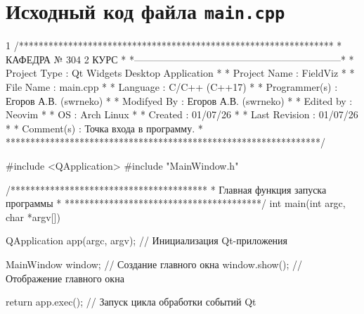 \section{Исходный код файла \texttt{main.cpp}}
\footnotesize
\begin{listing}{1}
/****************************************************************
*                     КАФЕДРА № 304 2 КУРС                       *
*---------------------------------------------------------------*
* Project Type  : Qt Widgets Desktop Application                *
* Project Name  : FieldViz                                      *
* File Name     : main.cpp                                       *
* Language      : C/C++ (C++17)                                  *
* Programmer(s) : Егоров А.В. (swrneko)                          *
* Modifyed By   : Егоров А.В. (swrneko)                          *
* Edited by     : Neovim                                         *
* OS            : Arch Linux                                     *
* Created       : 01/07/26                                       *
* Last Revision : 01/07/26                                       *
* Comment(s)    : Точка входа в программу.                       *
****************************************************************/

#include <QApplication>
#include "MainWindow.h"

/****************************************
* Главная функция запуска программы     *
****************************************/
int main(int argc, char *argv[]) {
  QApplication app(argc, argv); // Инициализация Qt-приложения

  MainWindow window; // Создание главного окна
  window.show(); // Отображение главного окна

  return app.exec(); // Запуск цикла обработки событий Qt
}

\end{listing}
\normalsize
\pagebreak

